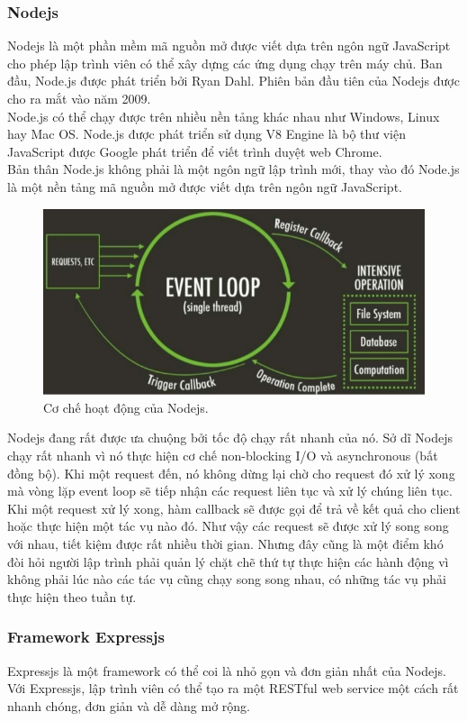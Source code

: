 \documentclass[a4paper,12pt,oneside]{article}
\begin{document}
\subsubsection{Nodejs}
\noindent Nodejs là một phần mềm mã nguồn mở được viết dựa trên ngôn ngữ JavaScript cho phép lập trình viên có thể xây dựng các ứng dụng chạy trên máy chủ. Ban đầu, Node.js được phát triển bởi Ryan Dahl. Phiên bản đầu tiên của Nodejs được cho ra mắt vào năm 2009.\\
 Node.js có thể chạy được trên nhiều nền tảng khác nhau như Windows, Linux hay Mac OS. Node.js được phát triển sử dụng V8 Engine là bộ thư viện JavaScript được Google phát triển để viết trình duyệt web Chrome.\\
 Bản thân Node.js không phải là một ngôn ngữ lập trình mới, thay vào đó Node.js là một nền tảng mã nguồn mở được viết dựa trên ngôn ngữ JavaScript.

\begin{figure}[htp]
\centering
\includegraphics[scale=.8]{hinh/nodejs.png}
\caption{Cơ chế hoạt động của Nodejs.}
\end{figure}

\noindent Nodejs đang rất được ưa chuộng bởi tốc độ chạy rất nhanh của nó. Sở dĩ Nodejs chạy rất nhanh vì nó thực hiện cơ chế non-blocking I/O và asynchronous (bất đồng bộ). Khi một request đến, nó không dừng lại chờ cho request đó xử lý xong mà vòng lặp event loop sẽ tiếp nhận các request liên tục và xử lý chúng liên tục. Khi một request xử lý xong, hàm callback sẽ được gọi để trả về kết quả cho client hoặc thực hiện một tác vụ nào đó. Như vậy các request sẽ được xử lý song song với nhau, tiết kiệm được rất nhiều thời gian. Nhưng đây cũng là một điểm khó đòi hỏi người lập trình phải quản lý chặt chẽ thứ tự thực hiện các hành động vì không phải lúc nào các tác vụ cũng chạy song song nhau, có những tác vụ phải thực hiện theo tuần tự.
\subsubsection{Framework Expressjs}
\noindent Expressjs là một framework có thể coi là nhỏ gọn và đơn giản nhất của Nodejs. Với Expressjs, lập trình viên có thể tạo ra một RESTful web service một cách rất nhanh chóng, đơn giản và dễ dàng mở rộng.
\end{document}

